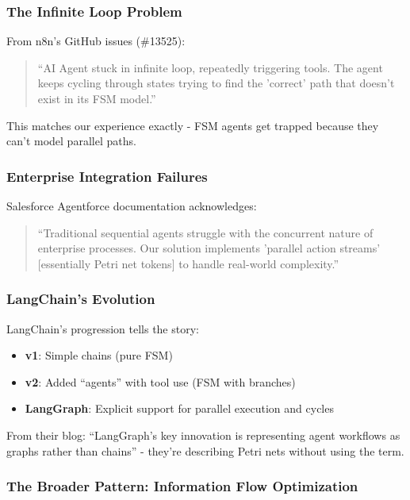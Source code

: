 \documentclass[11pt,a4paper]{article}
\begin{document}
\subsubsection{The Infinite Loop Problem}

From n8n's GitHub issues (\#13525):
\begin{quote}
``AI Agent stuck in infinite loop, repeatedly triggering tools. The agent keeps cycling through states trying to find the 'correct' path that doesn't exist in its FSM model.''
\end{quote}

This matches our experience exactly - FSM agents get trapped because they can't model parallel paths.

\subsubsection{Enterprise Integration Failures}

Salesforce Agentforce documentation acknowledges:
\begin{quote}
``Traditional sequential agents struggle with the concurrent nature of enterprise processes. Our solution implements 'parallel action streams' [essentially Petri net tokens] to handle real-world complexity.''
\end{quote}

\subsubsection{LangChain's Evolution}

LangChain's progression tells the story:
\begin{itemize}
\item \textbf{v1}: Simple chains (pure FSM)
\item \textbf{v2}: Added ``agents'' with tool use (FSM with branches)
\item \textbf{LangGraph}: Explicit support for parallel execution and cycles
\end{itemize}

From their blog: ``LangGraph's key innovation is representing agent workflows as graphs rather than chains'' - they're describing Petri nets without using the term.

\subsubsection{The Broader Pattern: Information Flow Optimization}
\end{document}
